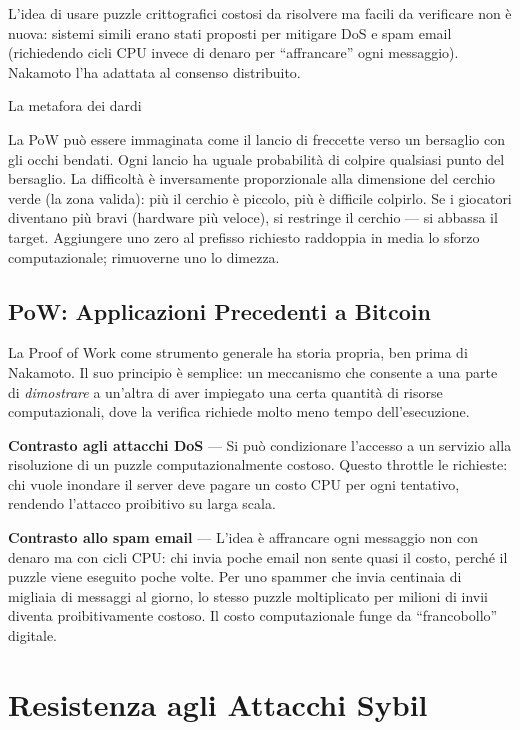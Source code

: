 \documentclass[
  italian,
  openany]{book}
\begin{document}
L'idea di usare puzzle crittografici costosi da risolvere ma facili da
verificare non è nuova: sistemi simili erano stati proposti per mitigare
DoS e spam email (richiedendo cicli CPU invece di denaro per
``affrancare'' ogni messaggio). Nakamoto l'ha adattata al consenso
distribuito.

\begin{callouttip}{La metafora dei dardi}

La PoW può essere immaginata come il lancio di freccette verso un
bersaglio con gli occhi bendati. Ogni lancio ha uguale probabilità di
colpire qualsiasi punto del bersaglio. La difficoltà è inversamente
proporzionale alla dimensione del cerchio verde (la zona valida): più il
cerchio è piccolo, più è difficile colpirlo. Se i giocatori diventano
più bravi (hardware più veloce), si restringe il cerchio --- si abbassa
il target. Aggiungere uno zero al prefisso richiesto raddoppia in media
lo sforzo computazionale; rimuoverne uno lo dimezza.

\end{callouttip}

\subsection{PoW: Applicazioni Precedenti a
Bitcoin}\label{pow-applicazioni-precedenti-a-bitcoin}

La Proof of Work come strumento generale ha storia propria, ben prima di
Nakamoto. Il suo principio è semplice: un meccanismo che consente a una
parte di \emph{dimostrare} a un'altra di aver impiegato una certa
quantità di risorse computazionali, dove la verifica richiede molto meno
tempo dell'esecuzione.

\textbf{Contrasto agli attacchi DoS} --- Si può condizionare l'accesso a
un servizio alla risoluzione di un puzzle computazionalmente costoso.
Questo throttle le richieste: chi vuole inondare il server deve pagare
un costo CPU per ogni tentativo, rendendo l'attacco proibitivo su larga
scala.

\textbf{Contrasto allo spam email} --- L'idea è affrancare ogni
messaggio non con denaro ma con cicli CPU: chi invia poche email non
sente quasi il costo, perché il puzzle viene eseguito poche volte. Per
uno spammer che invia centinaia di migliaia di messaggi al giorno, lo
stesso puzzle moltiplicato per milioni di invii diventa proibitivamente
costoso. Il costo computazionale funge da ``francobollo'' digitale.

\section{Resistenza agli Attacchi
Sybil}\label{resistenza-agli-attacchi-sybil}
\end{document}
